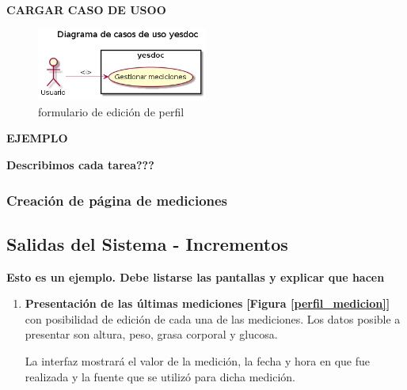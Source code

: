 \documentclass[a4paper,12pt]{article}
\begin{document}
\textbf{CARGAR CASO DE USOO}
    \begin{figure}[h]
        \centering
        \includegraphics[width=0.5\textwidth]{img/2-caso_de_uso}
        \caption{formulario de edición de perfil}
		\label{2-caso_de_uso}
    \end{figure}


\textbf{EJEMPLO}
	{\scriptsize
	\begin{center} %
	\centering
    	\end{center}
	}
    
    \textbf{Describimos cada tarea???}
\subsubsection{Creación de página de mediciones}

\subsection {Salidas del Sistema - Incrementos}
\textbf{Esto es un ejemplo. Debe listarse las pantallas y explicar que hacen}
\begin{enumerate}
    \item \textbf{Presentación de las últimas mediciones}  \textbf{[Figura  \ref{perfil_medicion}]} con posibilidad de edición de cada una de las mediciones. Los datos posible  a presentar son altura, peso, grasa corporal y glucosa. 
    
    La interfaz mostrará el valor de la medición, la fecha y hora en que fue realizada y la fuente que se utilizó para dicha medición.

\end{enumerate}
\end{document}
